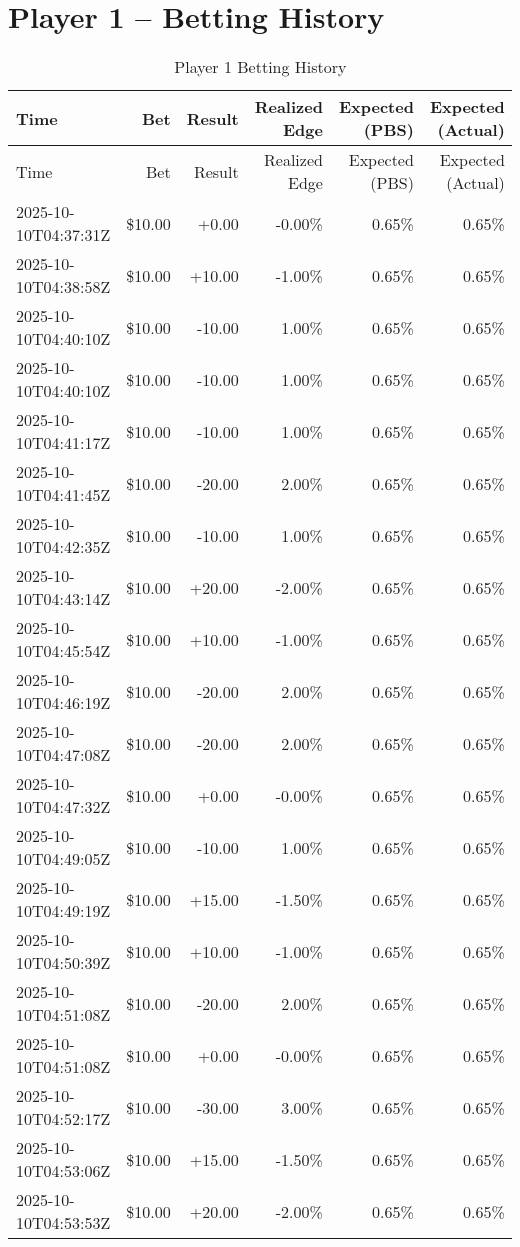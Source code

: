 \documentclass[11pt]{article}
\begin{document}
\section*{Player 1 -- Betting History}
\begin{longtable}{l | r | r | r | r | r}
\caption{Player 1 Betting History}\label{tab:history\_p1}\\
\hline
Time & Bet & Result & Realized Edge & Expected (PBS) & Expected (Actual) \\ \hline
\endfirsthead
\hline
Time & Bet & Result & Realized Edge & Expected (PBS) & Expected (Actual) \\ \hline
\endhead
2025-10-10T04:37:31Z & \$10.00 & +0.00 & -0.00\% & 0.65\% & 0.65\% \\
2025-10-10T04:38:58Z & \$10.00 & +10.00 & -1.00\% & 0.65\% & 0.65\% \\
2025-10-10T04:40:10Z & \$10.00 & -10.00 & 1.00\% & 0.65\% & 0.65\% \\
2025-10-10T04:40:10Z & \$10.00 & -10.00 & 1.00\% & 0.65\% & 0.65\% \\
2025-10-10T04:41:17Z & \$10.00 & -10.00 & 1.00\% & 0.65\% & 0.65\% \\
2025-10-10T04:41:45Z & \$10.00 & -20.00 & 2.00\% & 0.65\% & 0.65\% \\
2025-10-10T04:42:35Z & \$10.00 & -10.00 & 1.00\% & 0.65\% & 0.65\% \\
2025-10-10T04:43:14Z & \$10.00 & +20.00 & -2.00\% & 0.65\% & 0.65\% \\
2025-10-10T04:45:54Z & \$10.00 & +10.00 & -1.00\% & 0.65\% & 0.65\% \\
2025-10-10T04:46:19Z & \$10.00 & -20.00 & 2.00\% & 0.65\% & 0.65\% \\
2025-10-10T04:47:08Z & \$10.00 & -20.00 & 2.00\% & 0.65\% & 0.65\% \\
2025-10-10T04:47:32Z & \$10.00 & +0.00 & -0.00\% & 0.65\% & 0.65\% \\
2025-10-10T04:49:05Z & \$10.00 & -10.00 & 1.00\% & 0.65\% & 0.65\% \\
2025-10-10T04:49:19Z & \$10.00 & +15.00 & -1.50\% & 0.65\% & 0.65\% \\
2025-10-10T04:50:39Z & \$10.00 & +10.00 & -1.00\% & 0.65\% & 0.65\% \\
2025-10-10T04:51:08Z & \$10.00 & -20.00 & 2.00\% & 0.65\% & 0.65\% \\
2025-10-10T04:51:08Z & \$10.00 & +0.00 & -0.00\% & 0.65\% & 0.65\% \\
2025-10-10T04:52:17Z & \$10.00 & -30.00 & 3.00\% & 0.65\% & 0.65\% \\
2025-10-10T04:53:06Z & \$10.00 & +15.00 & -1.50\% & 0.65\% & 0.65\% \\
2025-10-10T04:53:53Z & \$10.00 & +20.00 & -2.00\% & 0.65\% & 0.65\% \\
\hline
\end{longtable}
\end{document}
